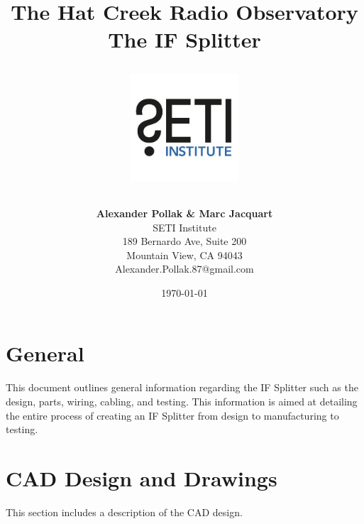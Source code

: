 \documentclass[12pt,a4paper,oneside]{article}
\title{\Huge The Hat Creek Radio Observatory\\
\vspace{0.5cm}
The IF Splitter\\
\vspace{0.5cm}
\normalsize \emph{}
\vspace{3.5cm}
\begin{center}
\includegraphics[height=4cm]{titlepage/SETI_institute_logo.jpg}
\end{center}
}
\author{ 
\vspace{1cm}
\Large
\textbf{ Alexander Pollak \& Marc Jacquart} \\
SETI Institute \\ 
189 Bernardo Ave, Suite 200 \\
Mountain View, CA 94043 \\ 
Alexander.Pollak.87@gmail.com\\
}
\date{\today}
\begin{document}
\clearpage\maketitle
\thispagestyle{empty}

%



%

\newpage

\section{General}
\label{sec:General}

This document outlines general information regarding the IF Splitter such as the design, parts, wiring, cabling, and testing. This information is aimed at detailing the entire process of creating an IF Splitter from design to manufacturing to testing. 



\section{CAD Design and Drawings}
\label{sec:CAD}
This section includes a description of the CAD design.

\hfill \break

%
%
\end{document}
